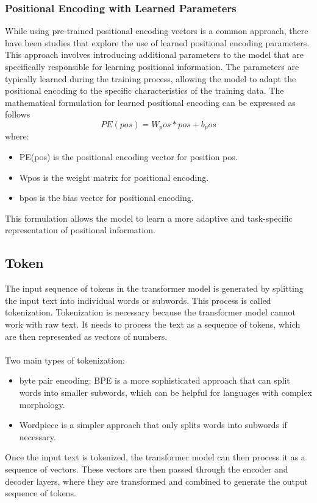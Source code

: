 \documentclass{article}
\begin{document}
\subsubsection{Positional Encoding with Learned Parameters}
While using pre-trained positional encoding vectors is a common approach, there have been studies that explore the use of learned positional encoding parameters. This approach involves introducing additional parameters to the model that are specifically responsible for learning positional information. The parameters are typically learned during the training process, allowing the model to adapt the positional encoding to the specific characteristics of the training data.
The mathematical formulation for learned positional encoding can be expressed as follows \\
\[ PE(pos) = W_pos * pos + b_pos \]
where:
\begin{itemize}
    \item PE(pos) is the positional encoding vector for position pos.
    \item Wpos is the weight matrix for positional encoding.
    \item bpos is the bias vector for positional encoding.
\end{itemize}

This formulation allows the model to learn a more adaptive and task-specific representation of positional information.

\subsection{Token} 
The input sequence of tokens in the transformer model is generated by splitting the input text into individual words or subwords. This process is called tokenization. Tokenization is necessary because the transformer model cannot work with raw text. It needs to process the text as a sequence of tokens, which are then represented as vectors of numbers. \\ \\
Two main types of tokenization: 
\begin{itemize}
    \item byte pair encoding: BPE is a more sophisticated approach that can split words into smaller subwords, which can be helpful for languages with complex morphology.
    \item Wordpiece is a simpler approach that only splits words into subwords if necessary.
\end{itemize}
Once the input text is tokenized, the transformer model can then process it as a sequence of vectors. These vectors are then passed through the encoder and decoder layers, where they are transformed and combined to generate the output sequence of tokens.
\end{document}

